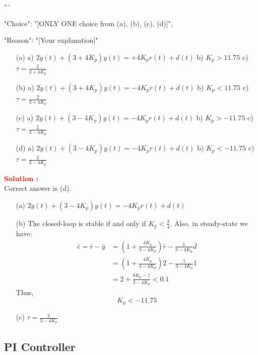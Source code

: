 \documentclass[12pt]{article}
\begin{document}
```
{

"Choice": "[ONLY ONE choice from (a), (b), (c), (d)]",

"Reason": "[Your explanation]"

}

\begin{itemize}
    \item[(a)] a) \(2 \dot{y}(t) + (3+4 K_p) y(t) = + 4 K_p r(t) + d(t)\) b) \(K_p > 11.75\) c) \(\tau = \frac{2}{3+4K_p}\) 
    \item[(b)] a) \(2 \dot{y}(t) + (3+4 K_p) y(t) = -4 K_p r(t) + d(t)\) b) \(K_p < 11.75\) c) \(\tau = \frac{2}{3+4K_p}\)
    \item[(c)] a) \(2 \dot{y}(t) + (3-4 K_p) y(t) = -4 K_p r(t) + d(t)\) b) \(K_p > -11.75\) c) \(\tau = \frac{2}{3-4K_p}\)
    \item[(d)] a) \(2 \dot{y}(t) + (3-4 K_p) y(t) = -4 K_p r(t) + d(t)\) b) \(K_p < -11.75\) c) \(\tau = \frac{2}{3-4K_p}\)
\end{itemize}



\textbf{\textcolor{red}{Solution :}} \\
Correct answer is (d).\\
\begin{itemize}
    \item[(a)] $ 2 \dot{y}(t) + (3-4 K_p) y(t) = -4 K_p r(t) + d(t)$
    \item[(b)] The closed-loop is stable if and only if \(K_p < \frac{3}{4}\). Also, in steady-state we have:
    \begin{align}
        \bar{e} = \bar{r} - \bar{y} &= \left(1+\frac{4 K_p}{3-4K_p} \right)\bar{r} - \frac{1}{3-4K_p} \bar{d} \\ &= \left(1+\frac{4 K_p}{3-4K_p} \right)2 - \frac{1}{3-4K_p} 1 \\
        & = 2 + \frac{8K_p-1}{3-4K_p} < 0.1
    \end{align}
    Thus,
    \begin{equation}
        K_p < -11.75
    \end{equation}
    \item[(c)] \(\tau = \frac{2}{3-4K_p}\)
\end{itemize}
\clearpage

\subsection{PI Controller}
\end{document}
